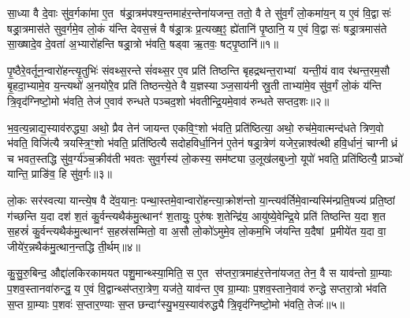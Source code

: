 
{\anuvakamend[{}]}

{\anuvakamend[{Wrtः ःsrpton ॑out Pr॒sn॒}]}

\setcounter{anuvakam}{0}
सा॒ध्या वै दे॒वाः सु॑व॒र्गका॑मा ए॒त ष॑ड्रा॒त्रम॑पश्य॒न्तमाह॑र॒न्तेना॑यजन्त॒ ततो॒ वै ते सु॑व॒र्गं लो॒कमा॑य॒न् य ए॒वं वि॒द्वासः॑ षड्रा॒त्रमास॑ते सुव॒र्गमे॒व लो॒कं य॑न्ति देवस॒त्त्रं वै ष॑ड्रा॒त्रः प्र॒त्यख्ष॒ꣵ॒ ह्ये॑तानि॑ पृ॒ष्ठानि॒ य ए॒वं वि॒द्वासः॑ षड्रा॒त्रमास॑ते सा॒ख्षादे॒व दे॒वता॑ अ॒भ्यारो॑हन्ति षड्रा॒त्रो भ॑वति॒ षड्वा ऋ॒तवः॒ षट्पृ॒ष्ठानि॑॥१॥

पृ॒ष्ठैरे॒वर्तून॒न्वारो॑हन्त्यृ॒तुभिः॑ संवथ्स॒रन्ते सं॑वथ्स॒र ए॒व प्रति॑ तिष्ठन्ति बृहद्रथन्त॒राभ्यां यन्ती॒यं वाव र॑थन्त॒रम॒सौ बृ॒हदा॒भ्यामे॒व य॒न्त्यथो॑ अ॒नयो॑रे॒व प्रति॑ तिष्ठन्त्ये॒ते वै य॒ज्ञस्याञ्ज॒साय॑नी स्रु॒ती ताभ्या॑मे॒व सु॑व॒र्गं लो॒कं य॑न्ति त्रि॒वृद॑ग्निष्टो॒मो भ॑वति॒ तेज॑ ए॒वाव॑ रुन्धते पञ्चद॒शो भ॑वतीन्द्रि॒यमे॒वाव॑ रुन्धते सप्तद॒शः॥२॥

भ॒व॒त्य॒न्नाद्य॒स्याव॑रुद्ध्या॒ अथो॒ प्रैव तेन॑ जायन्त एकवि॒ꣳ॒शो भ॑वति॒ प्रति॑ष्ठित्या॒ अथो॒ रुच॑मे॒वात्मन्द॑धते त्रिण॒वो भ॑वति॒ विजि॑त्यै त्रयस्त्रि॒ꣳ॒शो भ॑वति॒ प्रति॑ष्ठित्यै सदोहविर्धा॒निन॑ ए॒तेन॑ षड्रा॒त्रेण॑ यजेर॒न्नाश्व॑त्थी हवि॒र्धानं॒ चाग्नीध्रं च भवत॒स्तद्धि सु॑व॒र्ग्य॑ञ्च॒क्रीव॑ती भवतः सुव॒र्गस्य॑ लो॒कस्य॒ सम॑ष्ट्या उ॒लूख॑लबुध्नो॒ यूपो॑ भवति॒ प्रति॑ष्ठित्यै॒ प्राञ्चो॑ यान्ति॒ प्राङि॑व॒ हि सु॑व॒र्गः॥३॥

लो॒कः सर॑स्वत्या यान्त्ये॒ष वै दे॑व॒यानः॒ पन्था॒स्तमे॒वान्वारो॑हन्त्या॒क्रोश॑न्तो या॒न्त्यव॑र्तिमे॒वान्यस्मि॑न्प्रति॒षज्य॑ प्रति॒ष्ठां ग॑च्छन्ति य॒दा दश॑ श॒तं कु॒र्वन्त्यथैक॑मु॒त्थानꣳ॑ श॒तायुः॒ पुरु॑षः श॒तेन्द्रि॑य॒ आयु॑ष्ये॒वेन्द्रि॒ये प्रति॑ तिष्ठन्ति य॒दा श॒त स॒हस्रं॑ कु॒र्वन्त्यथैक॑मु॒त्थानꣳ॑ स॒हस्र॑सम्मितो॒ वा अ॒सौ लो॒को॑ऽमुमे॒व लो॒कम॒भि ज॑यन्ति य॒दैषां प्र॒मीये॑त य॒दा वा॒ जीये॑र॒न्नथैक॑मु॒त्थान॒न्तद्धि ती॒र्थम्॥४॥

{\anuvakamend[{पृ॒ष्ठानि॑ सप्तद॒शः सु॑व॒र्गो ज॑यन्ति य॒दैका॑दश च॥१॥}]}

कु॒सु॒रु॒बिन्द॒ औद्दा॑लकिरकामयत पशु॒मान्थ्स्या॒मिति॒ स ए॒त स॑प्तरा॒त्रमाह॑र॒त्तेना॑यजत॒ तेन॒ वै स याव॑न्तो ग्रा॒म्याः प॒शव॒स्तानवा॑रुन्द्ध॒ य ए॒वं वि॒द्वान्थ्स॑प्तरा॒त्रेण॒ यज॑ते॒ याव॑न्त ए॒व ग्रा॒म्याः प॒शव॒स्ताने॒वाव॑ रुन्द्धे सप्तरा॒त्रो भ॑वति स॒प्त ग्रा॒म्याः प॒शवः॑ स॒प्तार॒ण्याः स॒प्त छन्दाꣳ॑स्यु॒भय॒स्याव॑रुद्ध्यै त्रि॒वृद॑ग्निष्टो॒मो भ॑वति॒ तेजः॑॥५॥

